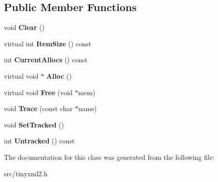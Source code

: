 \subsection*{Public Member Functions}
\begin{DoxyCompactItemize}
\item 
\mbox{\label{classCPlantBox_1_1tinyxml2_1_1MemPoolT_aa4963a0bf303983a95326a66982b9854}} 
void {\bfseries Clear} ()
\item 
\mbox{\label{classCPlantBox_1_1tinyxml2_1_1MemPoolT_aa6de67218da56d1648c12097acbbcd21}} 
virtual int {\bfseries Item\+Size} () const
\item 
\mbox{\label{classCPlantBox_1_1tinyxml2_1_1MemPoolT_ab316e46d180846f7b5fef5a865ba6ea8}} 
int {\bfseries Current\+Allocs} () const
\item 
\mbox{\label{classCPlantBox_1_1tinyxml2_1_1MemPoolT_a5a31aade6ee5ba3bb107937f0f1bc0f7}} 
virtual void $\ast$ {\bfseries Alloc} ()
\item 
\mbox{\label{classCPlantBox_1_1tinyxml2_1_1MemPoolT_aa0de3fa05ca21b89370a403c28d138e5}} 
virtual void {\bfseries Free} (void $\ast$mem)
\item 
\mbox{\label{classCPlantBox_1_1tinyxml2_1_1MemPoolT_a42678b20a9a78d4b55e64f0359c2c2de}} 
void {\bfseries Trace} (const char $\ast$name)
\item 
\mbox{\label{classCPlantBox_1_1tinyxml2_1_1MemPoolT_aac5e75409ea5d555265684d05aa6222c}} 
void {\bfseries Set\+Tracked} ()
\item 
\mbox{\label{classCPlantBox_1_1tinyxml2_1_1MemPoolT_aca9a6816d31994ae8d9cd704f90d14b8}} 
int {\bfseries Untracked} () const
\end{DoxyCompactItemize}


The documentation for this class was generated from the following file\+:\begin{DoxyCompactItemize}
\item 
src/tinyxml2.\+h\end{DoxyCompactItemize}
